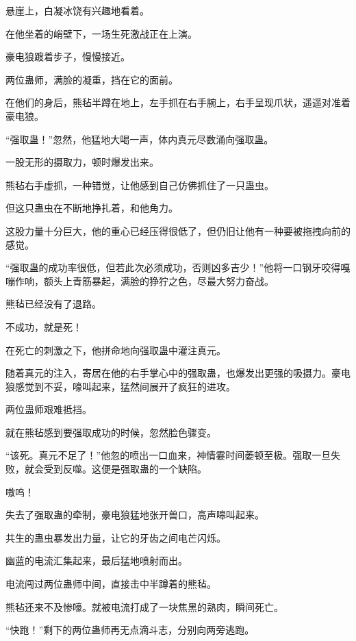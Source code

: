 
\begin{this_body}

悬崖上，白凝冰饶有兴趣地看着。

在他坐着的峭壁下，一场生死激战正在上演。

豪电狼踱着步子，慢慢接近。

两位蛊师，满脸的凝重，挡在它的面前。

在他们的身后，熊毡半蹲在地上，左手抓在右手腕上，右手呈现爪状，遥遥对准着豪电狼。

“强取蛊！”忽然，他猛地大喝一声，体内真元尽数涌向强取蛊。

一股无形的摄取力，顿时爆发出来。

熊毡右手虚抓，一种错觉，让他感到自己仿佛抓住了一只蛊虫。

但这只蛊虫在不断地挣扎着，和他角力。

这股力量十分巨大，他的重心已经压得很低了，但仍旧让他有一种要被拖拽向前的感觉。

“强取蛊的成功率很低，但若此次必须成功，否则凶多吉少！”他将一口钢牙咬得嘎嘣作响，额头上青筋暴起，满脸的狰狞之色，尽最大努力奋战。

熊毡已经没有了退路。

不成功，就是死！

在死亡的刺激之下，他拼命地向强取蛊中灌注真元。

随着真元的注入，寄居在他的右手掌心中的强取蛊，也爆发出更强的吸摄力。豪电狼感觉到不妥，嚎叫起来，猛然间展开了疯狂的进攻。

两位蛊师艰难抵挡。

就在熊毡感到要强取成功的时候，忽然脸色骤变。

“该死。真元不足了！”他忽的喷出一口血来，神情霎时间萎顿至极。强取一旦失败，就会受到反噬。这便是强取蛊的一个缺陷。

嗷呜！

失去了强取蛊的牵制，豪电狼猛地张开兽口，高声嗥叫起来。

共生的蛊虫暴发出力量，让它的牙齿之间电芒闪烁。

幽蓝的电流汇集起来，最后猛地喷射而出。

电流闯过两位蛊师中间，直接击中半蹲着的熊毡。

熊毡还来不及惨嚎。就被电流打成了一块焦黑的熟肉，瞬间死亡。

“快跑！”剩下的两位蛊师再无点滴斗志，分别向两旁逃跑。


\end{this_body}
